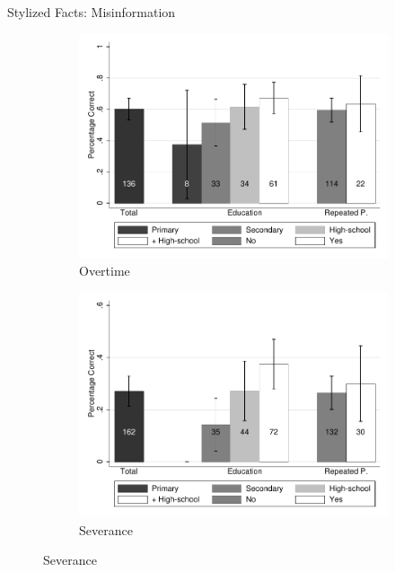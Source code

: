\documentclass[9pt]{beamer}
\begin{document}
\begin{frame}{Stylized Facts: Misinformation}
       \begin{figure}[H]
    \begin{center}
        \begin{subfigure}{0.49\textwidth}
            \caption{Overtime}
            \centering
            \includegraphics[width=1\textwidth]{Extra_hrs.pdf}
        \end{subfigure}
        \begin{subfigure}{0.49\textwidth}
            \caption{Severance}
                \centering
                \includegraphics[width=1\textwidth]{Correctly_knows.pdf}
        \end{subfigure}
        \end{center}
\end{figure}

   
\end{frame}
\end{document}
